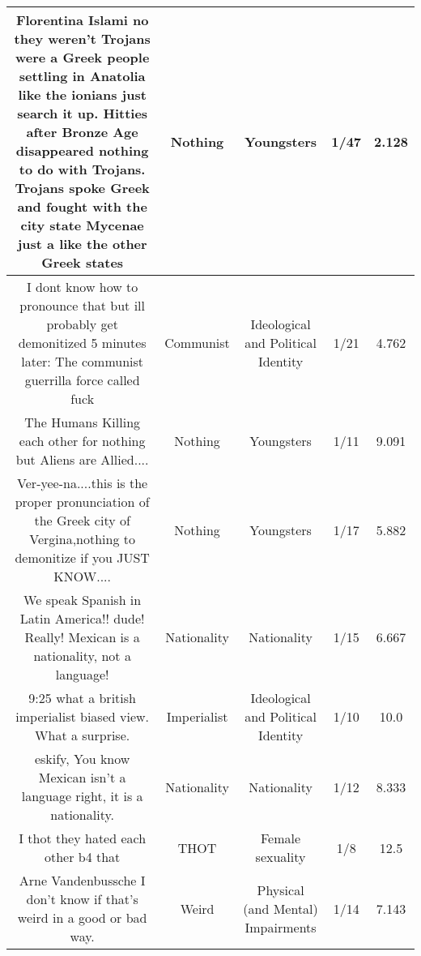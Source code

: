 \documentclass[11pt]{article}
\newlength\mylength
\begin{document}
\begin{center}
\begin{longtable}{|C{.40\mylength}|C{.30\mylength}|C{.15\mylength}|C{.15\mylength}|C{.15\mylength}|}
  Florentina Islami no they weren't Trojans were a Greek people settling in Anatolia like the ionians just search it up. Hitties after Bronze Age disappeared nothing to do with Trojans. Trojans spoke Greek and fought with the city state Mycenae just a like the other Greek states  & Nothing & Youngsters & 1/47 & 2.128 \\  \hline
   I dont know how to pronounce that but ill probably get demonitized  5 minutes later:   The communist guerrilla force called fuck   & Communist &  Ideological and Political Identity & 1/21 & 4.762 \\  \hline
  The Humans Killing each other for nothing but Aliens are Allied....  & Nothing & Youngsters & 1/11 & 9.091 \\  \hline
  Ver-yee-na....this is the proper pronunciation of the Greek city of Vergina,nothing to demonitize if you JUST KNOW....  & Nothing & Youngsters & 1/17 & 5.882 \\  \hline
  We speak Spanish in Latin America!! dude! Really! Mexican is a nationality, not a language!  & Nationality & Nationality & 1/15 & 6.667 \\  \hline
  9:25 what a british imperialist biased view.  What a surprise.  & Imperialist &  Ideological and Political Identity & 1/10 & 10.0 \\  \hline
   eskify, You know Mexican isn't a language right, it is a nationality.  & Nationality & Nationality & 1/12 & 8.333 \\  \hline
  I thot they hated each other b4 that  & THOT & Female sexuality & 1/8 & 12.5 \\  \hline
   Arne Vandenbussche I don't know if that's weird in a good or bad way.  & Weird & Physical (and Mental) Impairments & 1/14 & 7.143 \\  \hline

\end{longtable}
\end{center}
\end{document}
